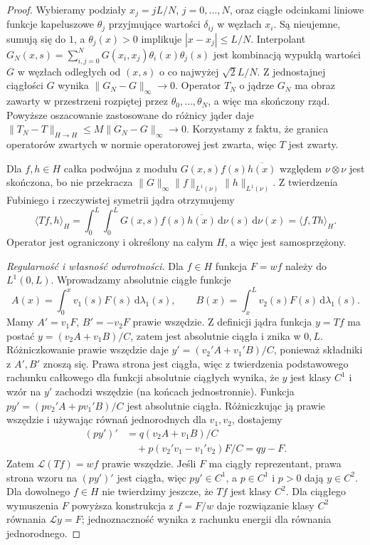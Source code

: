 \begin{proof}
Wybieramy podziały $x_j=jL/N$, $j=0,\ldots,N$,
oraz ciągłe odcinkami liniowe funkcje kapeluszowe
$\theta_j$ przyjmujące wartości $\delta_{ij}$ w węzłach $x_i$.
Są nieujemne, sumują się do $1$, a $\theta_j(x)>0$
implikuje $|x-x_j|\le L/N$.
Interpolant
$G_N(x,s)=\sum_{i,j=0}^NG(x_i,x_j)\theta_i(x)\theta_j(s)$
jest kombinacją wypukłą wartości $G$ w węzłach
odległych od $(x,s)$ o co najwyżej $\sqrt2 L/N$.
Z jednostajnej ciągłości $G$ wynika
$\|G_N-G\|_\infty\to0$.
Operator $T_N$ o jądrze $G_N$ ma obraz zawarty
w przestrzeni rozpiętej przez $\theta_0,\ldots,\theta_N$,
a więc ma skończony rząd. Powyższe oszacowanie
zastosowane do różnicy jąder daje
$\|T_N-T\|_{H\to H}\le M\|G_N-G\|_\infty\to0$.
Korzystamy z faktu, że granica operatorów zwartych
w normie operatorowej jest zwarta, więc $T$ jest zwarty.

Dla $f,h\in H$ całka podwójna z modułu
$G(x,s)f(s)\overline{h(x)}$ względem $\nu\otimes\nu$
jest skończona, bo nie przekracza
$\|G\|_\infty\|f\|_{L^1(\nu)}\|h\|_{L^1(\nu)}$.
Z twierdzenia Fubiniego i rzeczywistej symetrii jądra
otrzymujemy
\[
 \langle Tf,h\rangle_H
 =\int_0^L\int_0^L G(x,s)f(s)\overline{h(x)}
 \,\mathrm d\nu(s)\,\mathrm d\nu(x)
 =\langle f,Th\rangle_H.
\]
Operator jest ograniczony i określony na całym $H$,
a więc jest samosprzężony.

\emph{Regularność i własność odwrotności.}
Dla $f\in H$ funkcja $F=wf$ należy do $L^1(0,L)$.
Wprowadzamy absolutnie ciągłe funkcje
\[
 A(x)=\int_0^x v_1(s)F(s)\,\mathrm d\lambda_1(s),
 \qquad
 B(x)=\int_x^L v_2(s)F(s)\,\mathrm d\lambda_1(s).
\]
Mamy $A'=v_1F$, $B'=-v_2F$ prawie wszędzie.
Z definicji jądra funkcja $y=Tf$ ma postać
$y=(v_2 A+v_1 B)/C$, zatem jest absolutnie ciągła
i znika w $0,L$.
Różniczkowanie prawie wszędzie daje
$y'=(v_2'A+v_1'B)/C$, ponieważ składniki z $A',B'$
znoszą się. Prawa strona jest ciągła, więc z twierdzenia
podstawowego rachunku całkowego dla funkcji absolutnie
ciągłych wynika, że $y$ jest klasy $C^1$ i wzór na $y'$
zachodzi wszędzie (na końcach jednostronnie).
Funkcja $py'=(pv_2'A+pv_1'B)/C$ jest absolutnie ciągła.
Różniczkując ją prawie wszędzie i używając równań
jednorodnych dla $v_1,v_2$, dostajemy
\[
 \begin{aligned}
 (py')'
 &=q(v_2A+v_1B)/C\\
 &\quad +p(v_2'v_1-v_1'v_2)F/C
 =qy-F.
 \end{aligned}
\]
Zatem $\mathcal L(Tf)=wf$ prawie wszędzie.
Jeśli $F$ ma ciągły reprezentant, prawa strona wzoru
na $(py')'$ jest ciągła, więc $py'\in C^1$, a
$p\in C^1$ i $p>0$ dają $y\in C^2$.
Dla dowolnego $f\in H$ nie twierdzimy jeszcze,
że $Tf$ jest klasy $C^2$.
Dla ciągłego wymuszenia $F$ powyższa konstrukcja
z $f=F/w$ daje rozwiązanie klasy $C^2$ równania
$\mathcal Ly=F$; jednoznaczność wynika z rachunku energii
dla równania jednorodnego.


\end{proof}
